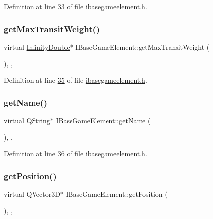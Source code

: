 Definition at line \hyperlink{a00047_source_l00033}{33} of file \hyperlink{a00047_source}{ibasegameelement.\+h}.

\mbox{\label{a00137_a4c74c903e19ada9da9150cf9569b4e9d}} 
\subsubsection{\texorpdfstring{get\+Max\+Transit\+Weight()}{getMaxTransitWeight()}}
{\footnotesize\ttfamily virtual \hyperlink{a00161}{Infinity\+Double}$\ast$ I\+Base\+Game\+Element\+::get\+Max\+Transit\+Weight (\begin{DoxyParamCaption}{ }\end{DoxyParamCaption})\hspace{0.3cm}{\ttfamily [inline]}, {\ttfamily [virtual]}, {\ttfamily [inherited]}}



Definition at line \hyperlink{a00047_source_l00035}{35} of file \hyperlink{a00047_source}{ibasegameelement.\+h}.

\mbox{\label{a00137_a01051b9a502128a82f9a168a14d1ecdc}} 
\subsubsection{\texorpdfstring{get\+Name()}{getName()}}
{\footnotesize\ttfamily virtual Q\+String$\ast$ I\+Base\+Game\+Element\+::get\+Name (\begin{DoxyParamCaption}{ }\end{DoxyParamCaption})\hspace{0.3cm}{\ttfamily [inline]}, {\ttfamily [virtual]}, {\ttfamily [inherited]}}



Definition at line \hyperlink{a00047_source_l00036}{36} of file \hyperlink{a00047_source}{ibasegameelement.\+h}.

\mbox{\label{a00137_a3159c02c1118989e3476b52d89a52401}} 
\subsubsection{\texorpdfstring{get\+Position()}{getPosition()}}
{\footnotesize\ttfamily virtual Q\+Vector3D$\ast$ I\+Base\+Game\+Element\+::get\+Position (\begin{DoxyParamCaption}{ }\end{DoxyParamCaption})\hspace{0.3cm}{\ttfamily [inline]}, {\ttfamily [virtual]}, {\ttfamily [inherited]}}



